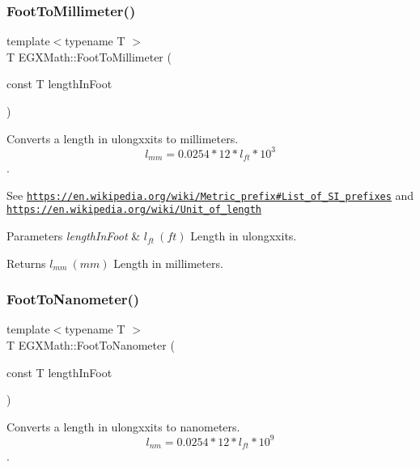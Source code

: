 \subsubsection{\texorpdfstring{Foot\+To\+Millimeter()}{FootToMillimeter()}}
{\footnotesize\ttfamily template$<$typename T $>$ \\
T E\+G\+X\+Math\+::\+Foot\+To\+Millimeter (\begin{DoxyParamCaption}\item[{const T}]{length\+In\+Foot }\end{DoxyParamCaption})}



Converts a length in ulongxxits to millimeters. \[ l_{mm}=0.0254 * 12 * l_{ft} * 10^{3} \]. 

See \href{https://en.wikipedia.org/wiki/Metric_prefix#List_of_SI_prefixes}{\tt https\+://en.\+wikipedia.\+org/wiki/\+Metric\+\_\+prefix\#\+List\+\_\+of\+\_\+\+S\+I\+\_\+prefixes} and \href{https://en.wikipedia.org/wiki/Unit_of_length}{\tt https\+://en.\+wikipedia.\+org/wiki/\+Unit\+\_\+of\+\_\+length} 
\begin{DoxyParams}{Parameters}
{\em length\+In\+Foot} & $ l_{ft}\ (ft)$ Length in ulongxxits. \\
\hline
\end{DoxyParams}
\begin{DoxyReturn}{Returns}
$ l_{mm}\ (mm)$ Length in millimeters. 
\end{DoxyReturn}
\mbox{\label{group___e_g_x_math-_conversions-_length_conversions-_imperial-_foot-_s_i_ga617c8ccb63241606ac5eacdac69f78c5}} 
\subsubsection{\texorpdfstring{Foot\+To\+Nanometer()}{FootToNanometer()}}
{\footnotesize\ttfamily template$<$typename T $>$ \\
T E\+G\+X\+Math\+::\+Foot\+To\+Nanometer (\begin{DoxyParamCaption}\item[{const T}]{length\+In\+Foot }\end{DoxyParamCaption})}



Converts a length in ulongxxits to nanometers. \[ l_{nm}=0.0254 * 12 * l_{ft} * 10^{9} \]. 

